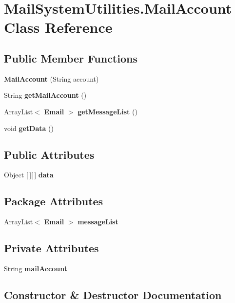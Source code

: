 \section{Mail\+System\+Utilities.\+Mail\+Account Class Reference}
\label{class_mail_system_utilities_1_1_mail_account}
\subsection*{Public Member Functions}
\begin{DoxyCompactItemize}
\item 
\textbf{ Mail\+Account} (String account)
\item 
String \textbf{ get\+Mail\+Account} ()
\item 
Array\+List$<$ \textbf{ Email} $>$ \textbf{ get\+Message\+List} ()
\item 
void \textbf{ get\+Data} ()
\end{DoxyCompactItemize}
\subsection*{Public Attributes}
\begin{DoxyCompactItemize}
\item 
Object [$\,$][$\,$] \textbf{ data}
\end{DoxyCompactItemize}
\subsection*{Package Attributes}
\begin{DoxyCompactItemize}
\item 
Array\+List$<$ \textbf{ Email} $>$ \textbf{ message\+List}
\end{DoxyCompactItemize}
\subsection*{Private Attributes}
\begin{DoxyCompactItemize}
\item 
String \textbf{ mail\+Account}
\end{DoxyCompactItemize}


\subsection{Constructor \& Destructor Documentation}
\mbox{\label{class_mail_system_utilities_1_1_mail_account_aed299f8a7ad50ab17c8b5c232ae19132}} 
